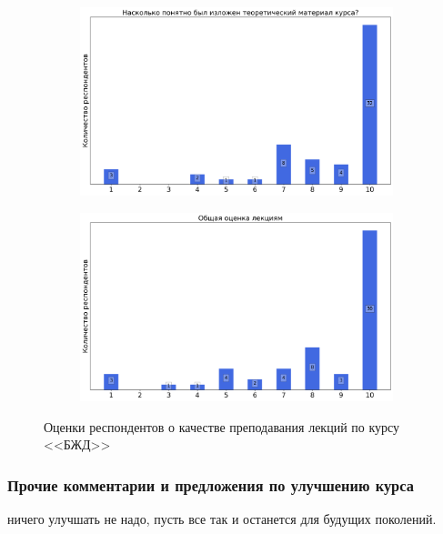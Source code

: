 \begin{figure}[H]
\begin{subfigure}[b]{0.45\textwidth}
			\end{subfigure}
			\begin{subfigure}[b]{0.45\textwidth}
				\centering
				\includegraphics[width=\textwidth]{images/1 course/БЖД/lecturer-marks-2.png}
			\end{subfigure}	
			\begin{subfigure}[b]{0.45\textwidth}
				\centering
				\includegraphics[width=\textwidth]{images/1 course/БЖД/lecturer-marks-3.png}
			\end{subfigure}
			\caption{Оценки респондентов о качестве преподавания лекций по курсу <<БЖД>>}
		\end{figure}
    

    \subsubsection{Прочие комментарии и предложения по улучшению курса}
        \begin{commentbox}
            ничего улучшать не надо, пусть все так и останется для будущих поколений.
        \end{commentbox}

